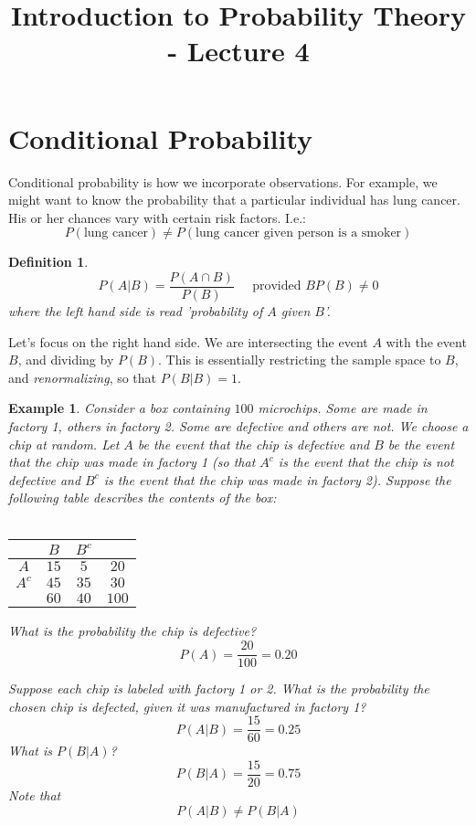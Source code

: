 \documentclass[12pt]{article} %
\date{}
\title{Introduction to Probability Theory - Lecture 4}
\newtheorem{defn}{Definition}
\newtheorem{example}{Example}
\begin{document}
\maketitle
\section{Conditional Probability}
Conditional probability is how we incorporate observations. For example, we might want to know the probability that a particular individual has lung cancer. His or her chances vary with certain risk factors. I.e.:
$$P(\textrm{lung cancer})\neq P(\textrm{lung cancer given person is a smoker})$$
\begin{defn}
$$P(A|B) = \frac{P(A\cap B)}{P(B)} \;\;\;\;\;\textrm{provided }BP(B)\neq 0$$
where the left hand side is read 'probability of $A$ given $B$'. 
\end{defn}
Let's focus on the right hand side. We are intersecting the event $A$ with the event $B$, and dividing by $P(B)$. This is essentially restricting the sample space to $B$, and \emph{renormalizing}, so that $P(B|B) = 1$.
\begin{example}
Consider a box containing $100$ microchips. Some are made in factory 1, others in factory 2. Some are defective and others are not. We choose a chip at random. Let $A$ be the event that the chip is defective and $B$ be the event that the chip was made in factory 1 (so that $A^c$ is the event that the chip is not defective and $B^c$ is the event that the chip was made in factory 2). Suppose the following table describes the contents of the box:\\\\
\begin{tabular}{c|c c|c}
& $B$ & $B^c$& \\
\hline
$A$& $15$& $5$ &$20$\\
$A^c$& $45$ & $35$ &$30$\\
\hline
& $60$ & $40$ & $100$
\end{tabular}

What is the probability the chip is defective?
$$P(A) = \frac{20}{100} = 0.20$$

Suppose each chip is labeled with factory 1 or 2. What is the probability the chosen chip is defected, given it was manufactured in factory 1?
$$P(A|B) = \frac{15}{60} = 0.25$$
What is $P(B|A)$?
$$P(B|A) = \frac{15}{20} = 0.75$$
Note that
$$P(A|B) \neq P(B|A)$$
\end{example}
\end{document}
